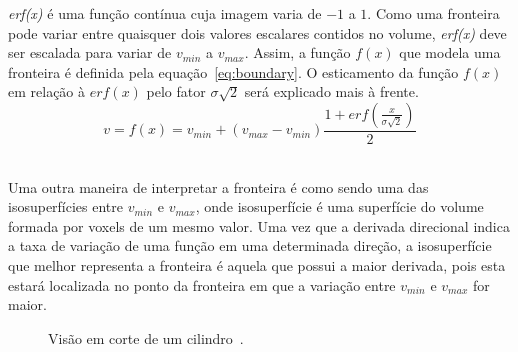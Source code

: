 	\textit{erf(x)} é uma função contínua cuja imagem varia de $-1$ a $1$. Como uma fronteira pode variar entre quaisquer dois valores escalares contidos no volume, \textit{erf(x)} deve ser escalada para variar de $v_{min}$ a $v_{max}$. Assim, a função $f(x)$ que modela uma fronteira é definida pela equação~\eqref{eq:boundary}. O esticamento da função $ f(x) $ em relação à $ erf(x) $ pelo fator $ \sigma\sqrt{2} $ será explicado mais à frente.
	\\

\begin{equation} \label{eq:boundary}
	v = f(x) = v_{min} + (v_{max} - v_{min}) \frac{1 + erf(\frac{x}{\sigma\sqrt{2}})}{2}
\end{equation} \

	Uma outra maneira de interpretar a fronteira é como sendo uma das isosuperfícies entre $v_{min}$ e $v_{max}$, onde isosuperfície é uma superfície do volume formada por voxels de um mesmo valor. Uma vez que a derivada direcional indica a taxa de variação de uma função em uma determinada direção, a isosuperfície que melhor representa a fronteira é aquela que possui a maior derivada, pois esta estará localizada no ponto da fronteira em que a variação entre $v_{min}$ e $v_{max}$ for maior.
	
\begin{figure}[h]
	\centering
	\caption{Visão em corte de um cilindro~\cite{gordon}.}
	\label{fig:g_isosurfaces}
\end{figure}
	
